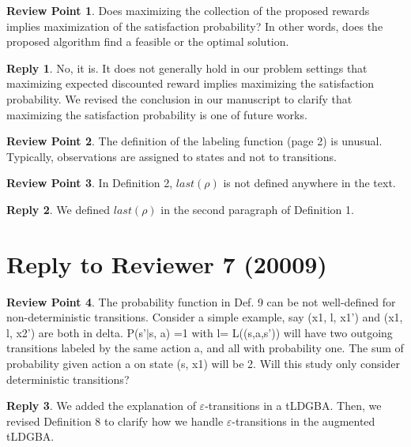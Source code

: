 \documentclass[10 pt, dvipdfmx]{article}
\theoremstyle{definition}
\newtheorem{review point}{Review Point}[section]
\newtheorem*{reply}{Reply}
\begin{document}
\begin{review point}
  Does maximizing the collection of the proposed rewards implies
maximization of the satisfaction probability? In other words, does the
proposed algorithm find a feasible or the optimal solution.
\end{review point}

\begin{reply}
 No, it is. It does not generally hold in our problem settings that maximizing expected discounted reward implies maximizing the satisfaction probability. We revised the conclusion in our manuscript to clarify that maximizing the satisfaction probability is one of future works.
\end{reply}

\begin{review point}
  The definition of the labeling function (page 2) is unusual. Typically, observations are assigned to states and not to transitions.
\end{review point}

\begin{review point}
  In Definition 2, $last(\rho)$ is not defined anywhere in the text.
\end{review point}

\begin{reply}
  We defined $last(\rho)$ in the second paragraph of Definition 1.
\end{reply}

\section{Reply to Reviewer 7 (20009)}

\begin{review point}
  The probability function in Def. 9 can be not well-defined for
non-deterministic transitions. Consider a simple example, say (x1, l,
x1') and (x1, l, x2') are both in delta. P(s'$|$s, a) =1 with l=
L((s,a,s')) will have two outgoing transitions labeled by the same
action a, and all with probability one. The sum of probability given
action a on state (s, x1) will be 2. Will this study only consider
deterministic transitions?
\end{review point}

\begin{reply}
  We added the explanation of $\varepsilon$-transitions in a tLDGBA. Then, we revised Definition 8 to clarify how we handle $\varepsilon$-transitions in the augmented tLDGBA.
\end{reply}
\end{document}
